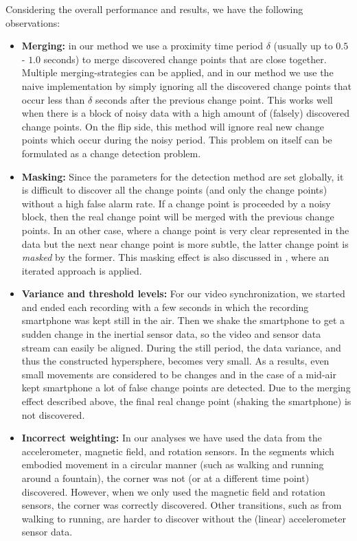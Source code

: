 Considering the overall performance and results, we have the following observations:
\begin{itemize}
  \item \textbf{Merging:} in our method we use a proximity time period $\delta$ (usually up to $0.5$ - $1.0$ seconds) to merge discovered change points that are close together.
  Multiple merging-strategies can be applied, and in our method we use the naive implementation by simply ignoring all the discovered change points that occur less than $\delta$ seconds after the previous change point.
  This works well when there is a block of noisy data with a high amount of (falsely) discovered change points.
  On the flip side, this method will ignore real new change points which occur during the noisy period.
  This problem on itself can be formulated as a change detection problem.
  \item \textbf{Masking:} Since the parameters for the detection method are set globally, it is difficult to discover all the change points (and only the change points) without a high false alarm rate.
  If a change point is proceeded by a noisy block, then the real change point will be merged with the previous change points.
  In an other case, where a change point is very clear represented in the data but the next near change point is more subtle, the latter change point is \emph{masked} by the former.
  This masking effect is also discussed in \cite{inclan1994use}, where an iterated approach is applied.
  \item \textbf{Variance and threshold levels:} For our video synchronization, we started and ended each recording with a few seconds in which the recording smartphone was kept still in the air.
  Then we shake the smartphone to get a sudden change in the inertial sensor data, so the video and sensor data stream can easily be aligned.
  During the still period, the data variance, and thus the constructed hypersphere, becomes very small.
  As a results, even small movements are considered to be changes and in the case of a mid-air kept smartphone a lot of false change points are detected.
  Due to the merging effect described above, the final real change point (shaking the smartphone) is not discovered.
  \item \textbf{Incorrect weighting:} In our analyses we have used the data from the accelerometer, magnetic field, and rotation sensors.
  In the segments which embodied movement in a circular manner (such as walking and running around a fountain), the corner was not (or at a different time point) discovered.
  However, when we only used the magnetic field and rotation sensors, the corner was correctly discovered.
  Other transitions, such as from walking to running, are harder to discover without the (linear) accelerometer sensor data.
\end{itemize}

